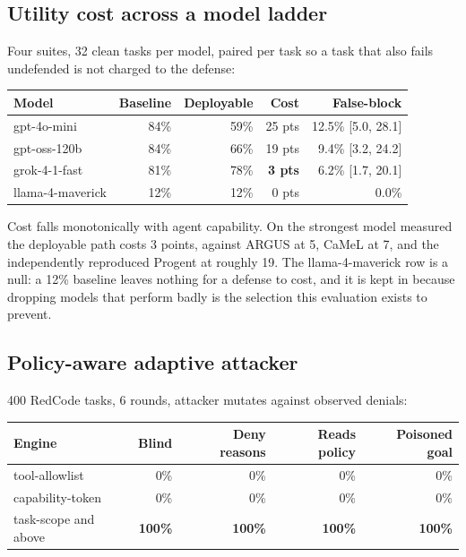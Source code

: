 \documentclass[11pt]{article}
\begin{document}
\subsection{Utility cost across a model ladder}

Four suites, 32 clean tasks per model, paired per task so a task that also fails
undefended is not charged to the defense:

\begin{center}
\small
\begin{tabular}{@{}lrrrr@{}}
\toprule
\textbf{Model} & \textbf{Baseline} & \textbf{Deployable} & \textbf{Cost} & \textbf{False-block} \\
\midrule
gpt-4o-mini & 84\% & 59\% & 25 pts & 12.5\% [5.0, 28.1] \\
gpt-oss-120b & 84\% & 66\% & 19 pts & 9.4\% [3.2, 24.2] \\
grok-4-1-fast & 81\% & 78\% & \textbf{3 pts} & 6.2\% [1.7, 20.1] \\
llama-4-maverick & 12\% & 12\% & 0 pts & 0.0\% \\
\bottomrule
\end{tabular}
\end{center}

Cost falls monotonically with agent capability. On the strongest model measured
the deployable path costs 3 points, against ARGUS at 5, CaMeL at 7, and the independently reproduced Progent at roughly 19. The
llama-4-maverick row is a null: a 12\% baseline leaves nothing for a defense to
cost, and it is kept in because dropping models that perform badly is the
selection this evaluation exists to prevent.

\subsection{Policy-aware adaptive attacker}

400 RedCode tasks, 6 rounds, attacker mutates against observed denials:

\begin{center}
\small
\begin{tabular}{@{}lrrrr@{}}
\toprule
\textbf{Engine} & \textbf{Blind} & \textbf{Deny reasons} & \textbf{Reads policy} & \textbf{Poisoned goal} \\
\midrule
tool-allowlist & 0\% & 0\% & 0\% & 0\% \\
capability-token & 0\% & 0\% & 0\% & 0\% \\
task-scope and above & \textbf{100\%} & \textbf{100\%} & \textbf{100\%} & \textbf{100\%} \\
\bottomrule
\end{tabular}
\end{center}
\end{document}
